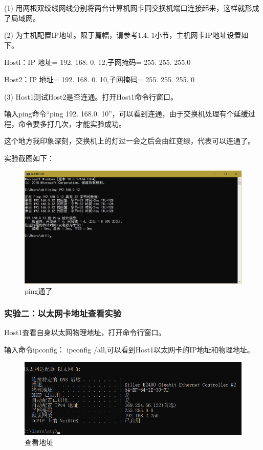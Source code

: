 \documentclass[lang=cn,11pt,a4paper,cite=authoryear]{elegantpaper}
\begin{document}
(1)	用两根双绞线网线分别将两台计算机网卡同交换机端口连接起来，这样就形成了局域网。

(2)	为主机配置IP地址。限于篇幅，请参考1.4. 1小节，主机网卡IP地址设置如下。

Hostl：IP 地址= 192. 168. 0. 12,子网掩码= 255. 255. 255.0

Host2：IP 地址= 192. 168. 0. 10,子网掩码= 255. 255. 255. 0

(3)	Host1测试Host2是否连通。打开Host1命令行窗口。

输入ping命令“ping 192. 168.0. 10”，可以看到连通，由于交换机处理有个延缓过程，命令要多打几次，才能实验成功。

这个地方我印象深刻，交换机上的灯过一会之后会由红变绿，代表可以连通了。

实验截图如下：

\begin{figure}[htbp]
	\centering
	\includegraphics[width=0.7\linewidth]{image/ping}
	\caption{ping通了}
	\label{fig:ping}
\end{figure}



\subsubsection{实验二：以太网卡地址查看实验}

Host1査看自身以太网物理地址，打开命令行窗口。

输入命令ipconfig： ipconfig /all,可以看到Host1以太网卡的IP地址和物理地址。

\begin{figure}[htbp]
	\centering
	\includegraphics[width=0.7\linewidth]{image/screenshot016}
	\caption{查看地址}
	\label{fig:screenshot016}
\end{figure}
\end{document}
